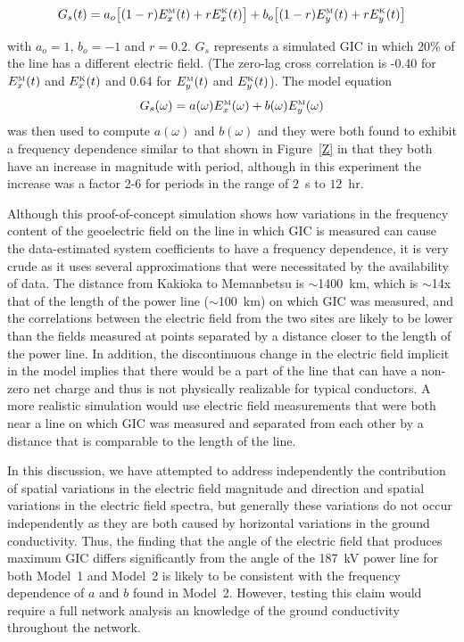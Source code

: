 \documentclass[draft,linenumbers]{agujournal2018}
\begin{document}
\begin{equation}
  G_s(t)=a_o\big[(1-r)E^{\mbox{\tiny M}}_x(t) + rE^{\mbox{\tiny K}}_x(t)\big]+b_o\big[(1-r)E^{\mbox{\tiny M}}_y(t) + rE^{\mbox{\tiny K}}_y(t)\big]
\end{equation}

\noindent
with $a_o=1$, $b_o=-1$ and $r=0.2$. $G_s$ represents a simulated GIC in which 20\% of the line has a different electric field. (The zero-lag cross correlation is -0.40 for $E^{\mbox{\tiny M}}_x(t)$ and $E^{\mbox{\tiny K}}_x(t)$ and 0.64 for $E^{\mbox{\tiny M}}_y(t)$ and $E^{\mbox{\tiny K}}_y(t)$). The model equation
\begin{equation}
  G_s(\omega)=a(\omega)E^{\mbox{\tiny M}}_x(\omega)+b(\omega)E^{\mbox{\tiny M}}_y(\omega)
\end{equation}
\noindent
was then used to compute $a(\omega)$ and $b(\omega)$ and they were both found to exhibit a frequency dependence similar to that shown in Figure~\ref{Z} in that they both have an increase in magnitude with period, although in this experiment the increase was a factor 2-6 for periods in the range of $2$~s to $12$~hr.

Although this proof-of-concept simulation shows how variations in the frequency content of the geoelectric field on the line in which GIC is measured can cause the data-estimated system coefficients to have a frequency dependence, it is very crude as it uses several approximations that were necessitated by the availability of data. The distance from Kakioka to Memanbetsu is $\sim$1400~km, which is $\sim$14x that of the length of the power line ($\sim$100~km) on which GIC was measured, and the correlations between the electric field from the two sites are likely to be lower than the fields measured at points separated by a distance closer to the length of the power line. In addition, the discontinuous change in the electric field implicit in the model implies that there would be a part of the line that can have a non-zero net charge and thus is not physically realizable for typical conductors. A more realistic simulation would use electric field measurements that were both near a line on which GIC was measured and separated from each other by a distance that is comparable to the length of the line. 

In this discussion, we have attempted to address independently the contribution of spatial variations in the electric field magnitude and direction and spatial variations in the electric field spectra, but generally these variations do not occur independently as they are both caused by horizontal variations in the ground conductivity. Thus, the finding that the angle of the electric field that produces maximum GIC differs significantly from the angle of the 187~kV power line for both Model~1 and Model~2 is likely to be consistent with the frequency dependence of $a$ and $b$ found in Model~2. However, testing this claim would require a full network analysis an knowledge of the ground conductivity throughout the network.
 
\end{document}
